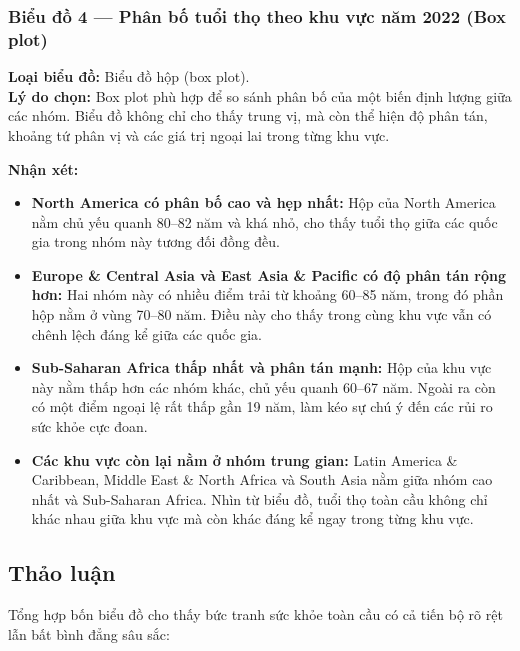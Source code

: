 \subsubsection{Biểu đồ 4 --- Phân bố tuổi thọ theo khu vực năm 2022 (Box plot)}

\textbf{Loại biểu đồ:} Biểu đồ hộp (box plot).\\
\textbf{Lý do chọn:} Box plot phù hợp để so sánh phân bố của một biến định lượng giữa các nhóm. Biểu đồ không chỉ cho thấy trung vị, mà còn thể hiện độ phân tán, khoảng tứ phân vị và các giá trị ngoại lai trong từng khu vực.


\textbf{Nhận xét:}
\begin{itemize}
    \item \textbf{North America có phân bố cao và hẹp nhất:} Hộp của North America nằm chủ yếu quanh 80--82 năm và khá nhỏ, cho thấy tuổi thọ giữa các quốc gia trong nhóm này tương đối đồng đều.
    \item \textbf{Europe \& Central Asia và East Asia \& Pacific có độ phân tán rộng hơn:} Hai nhóm này có nhiều điểm trải từ khoảng 60--85 năm, trong đó phần hộp nằm ở vùng 70--80 năm. Điều này cho thấy trong cùng khu vực vẫn có chênh lệch đáng kể giữa các quốc gia.
    \item \textbf{Sub-Saharan Africa thấp nhất và phân tán mạnh:} Hộp của khu vực này nằm thấp hơn các nhóm khác, chủ yếu quanh 60--67 năm. Ngoài ra còn có một điểm ngoại lệ rất thấp gần 19 năm, làm kéo sự chú ý đến các rủi ro sức khỏe cực đoan.
    \item \textbf{Các khu vực còn lại nằm ở nhóm trung gian:} Latin America \& Caribbean, Middle East \& North Africa và South Asia nằm giữa nhóm cao nhất và Sub-Saharan Africa. Nhìn từ biểu đồ, tuổi thọ toàn cầu không chỉ khác nhau giữa khu vực mà còn khác đáng kể ngay trong từng khu vực.
\end{itemize}

\subsection{Thảo luận}

Tổng hợp bốn biểu đồ cho thấy bức tranh sức khỏe toàn cầu có cả tiến bộ rõ rệt lẫn bất bình đẳng sâu sắc:

